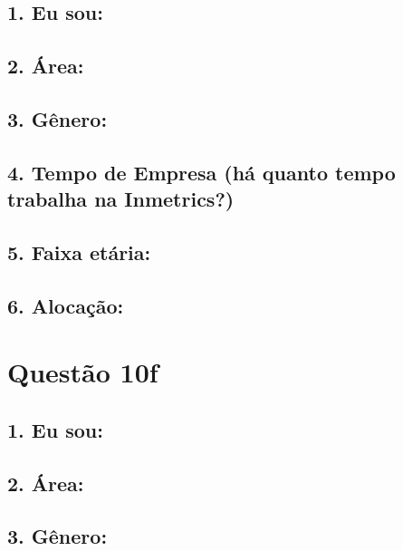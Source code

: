 \documentclass[]{book}
\begin{document}
\hypertarget{eu-sou-6}{%
\subsection{1. Eu sou:}\label{eu-sou-6}}

\hypertarget{area-6}{%
\subsection{2. Área:}\label{area-6}}

\hypertarget{genero-6}{%
\subsection{3. Gênero:}\label{genero-6}}

\hypertarget{tempo-de-empresa-ha-quanto-tempo-trabalha-na-inmetrics-6}{%
\subsection{4. Tempo de Empresa (há quanto tempo trabalha na Inmetrics?)}\label{tempo-de-empresa-ha-quanto-tempo-trabalha-na-inmetrics-6}}

\hypertarget{faixa-etaria-6}{%
\subsection{5. Faixa etária:}\label{faixa-etaria-6}}

\hypertarget{alocacao-6}{%
\subsection{6. Alocação:}\label{alocacao-6}}

\hypertarget{questao-10f}{%
\section{Questão 10f}\label{questao-10f}}

\hypertarget{eu-sou-7}{%
\subsection{1. Eu sou:}\label{eu-sou-7}}

\hypertarget{area-7}{%
\subsection{2. Área:}\label{area-7}}

\hypertarget{genero-7}{%
\subsection{3. Gênero:}\label{genero-7}}
\end{document}
